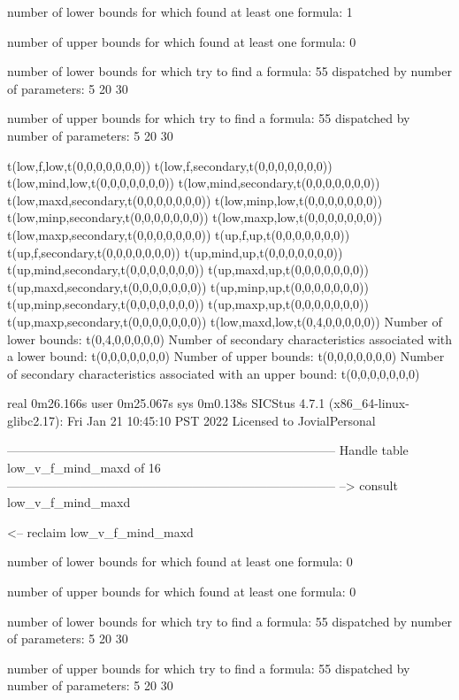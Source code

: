 number of lower bounds for which found at least one formula: 1

number of upper bounds for which found at least one formula: 0

number of lower bounds for which try to find a formula: 55
dispatched by number of parameters: 5  20  30

number of upper bounds for which try to find a formula: 55
dispatched by number of parameters: 5  20  30

t(low,f,low,t(0,0,0,0,0,0,0))
t(low,f,secondary,t(0,0,0,0,0,0,0))
t(low,mind,low,t(0,0,0,0,0,0,0))
t(low,mind,secondary,t(0,0,0,0,0,0,0))
t(low,maxd,secondary,t(0,0,0,0,0,0,0))
t(low,minp,low,t(0,0,0,0,0,0,0))
t(low,minp,secondary,t(0,0,0,0,0,0,0))
t(low,maxp,low,t(0,0,0,0,0,0,0))
t(low,maxp,secondary,t(0,0,0,0,0,0,0))
t(up,f,up,t(0,0,0,0,0,0,0))
t(up,f,secondary,t(0,0,0,0,0,0,0))
t(up,mind,up,t(0,0,0,0,0,0,0))
t(up,mind,secondary,t(0,0,0,0,0,0,0))
t(up,maxd,up,t(0,0,0,0,0,0,0))
t(up,maxd,secondary,t(0,0,0,0,0,0,0))
t(up,minp,up,t(0,0,0,0,0,0,0))
t(up,minp,secondary,t(0,0,0,0,0,0,0))
t(up,maxp,up,t(0,0,0,0,0,0,0))
t(up,maxp,secondary,t(0,0,0,0,0,0,0))
t(low,maxd,low,t(0,4,0,0,0,0,0))
Number of lower bounds:                                             t(0,4,0,0,0,0,0)
Number of secondary characteristics associated with a lower bound:  t(0,0,0,0,0,0,0)
Number of upper bounds:                                             t(0,0,0,0,0,0,0)
Number of secondary characteristics associated with an upper bound: t(0,0,0,0,0,0,0)

real	0m26.166s
user	0m25.067s
sys	0m0.138s
SICStus 4.7.1 (x86_64-linux-glibc2.17): Fri Jan 21 10:45:10 PST 2022
Licensed to JovialPersonal


--------------------------------------------------------------------------------
Handle table low_v_f_mind_maxd of 16
--------------------------------------------------------------------------------
--> consult low_v_f_mind_maxd

<-- reclaim low_v_f_mind_maxd

number of lower bounds for which found at least one formula: 0

number of upper bounds for which found at least one formula: 0

number of lower bounds for which try to find a formula: 55
dispatched by number of parameters: 5  20  30

number of upper bounds for which try to find a formula: 55
dispatched by number of parameters: 5  20  30

